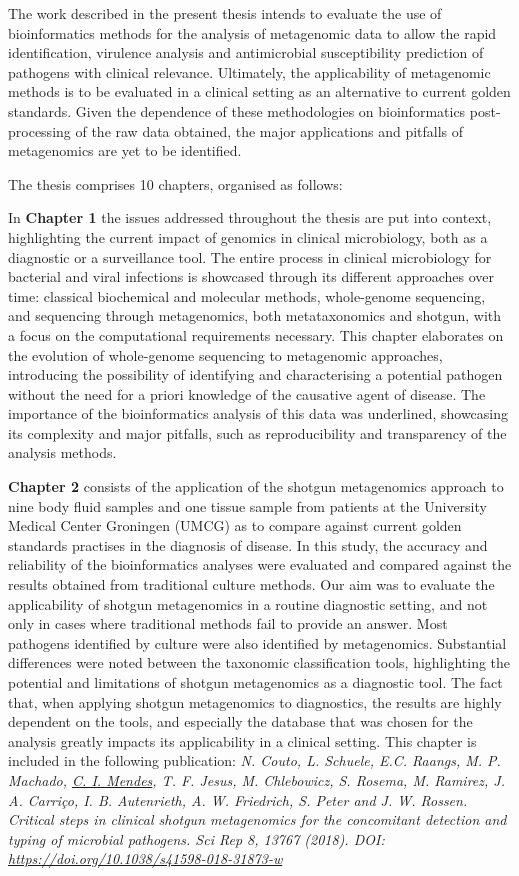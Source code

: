 The work described in the present thesis intends to evaluate the use of bioinformatics methods for the analysis of metagenomic data to allow the rapid identification, virulence analysis and antimicrobial susceptibility prediction of pathogens with clinical relevance. Ultimately, the applicability of metagenomic methods is to be evaluated in a clinical setting as an alternative to current golden standards. Given the dependence of these methodologies on bioinformatics post-processing of the raw data obtained, the major applications and pitfalls of metagenomics are yet to be identified. 

The thesis comprises 10 chapters, organised as follows:

In \textbf{Chapter 1} the issues addressed throughout the thesis are put into context, highlighting the current impact of genomics in clinical microbiology, both as a diagnostic or a surveillance tool. The entire process in clinical microbiology for bacterial and viral infections is showcased through its different approaches over time: classical biochemical and molecular methods, whole-genome sequencing, and sequencing through metagenomics, both metataxonomics and shotgun, with a focus on the computational requirements necessary. This chapter elaborates on the evolution of whole-genome sequencing to metagenomic approaches, introducing the possibility of identifying and characterising a potential pathogen without the need for a priori knowledge of the causative agent of disease. The importance of the bioinformatics analysis of this data was underlined, showcasing its complexity and major pitfalls, such as reproducibility and transparency of the analysis methods.   

\textbf{Chapter 2} consists of the application of the shotgun metagenomics approach to nine body fluid samples and one tissue sample from patients at the University Medical Center Groningen (UMCG) as to compare against current golden standards practises in the diagnosis of disease. In this study, the accuracy and reliability of the bioinformatics analyses were evaluated and compared against the results obtained from traditional culture methods. Our aim was to evaluate the applicability of shotgun metagenomics in a routine diagnostic setting, and not only in cases where traditional methods fail to provide an answer. Most pathogens identified by culture were also identified by metagenomics. Substantial differences were noted between the taxonomic classification tools, highlighting the potential and limitations of shotgun metagenomics as a diagnostic tool. The fact that, when applying shotgun metagenomics to diagnostics, the results are highly dependent on the tools, and especially the database that was chosen for the analysis greatly impacts its applicability in a clinical setting. This chapter is included in the following publication:\textit{ N. Couto, L. Schuele, E.C. Raangs, M. P. Machado, \underline{C. I. Mendes}, T. F. Jesus, M. Chlebowicz,  S. Rosema, M. Ramirez, J. A. Carriço, I. B. Autenrieth, A. W. Friedrich, S. Peter and J. W. Rossen. Critical steps in clinical shotgun metagenomics for the concomitant detection and typing of microbial pathogens. Sci Rep 8, 13767 (2018). DOI: \url{https://doi.org/10.1038/s41598-018-31873-w}}

